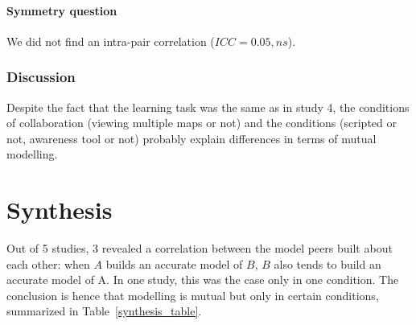 \documentclass[natbib]{svjour3}
\newcommand{\gmodel}[2]{{$\mathcal{M}(#1, #2)$}}
\begin{document}
\paragraph{Symmetry question} We did not find an intra-pair correlation ($ICC =
0.05, ns$).


\subsubsection*{Discussion}

Despite the fact that the learning task was the same as in study 4, the
conditions of collaboration (viewing multiple maps or not) and the conditions
(scripted or not, awareness tool or not) probably explain differences in terms
of mutual modelling.

\section{Synthesis}

Out of 5 studies, 3 revealed a correlation between the model peers built about
each other: when $A$ builds an accurate model of $B$, $B$ also tends to build an
accurate model of A.  In one study, this was the case only in one condition.
The conclusion is hence that modelling is mutual but only in certain conditions,
summarized in Table~\ref{synthesis_table}.
\end{document}
